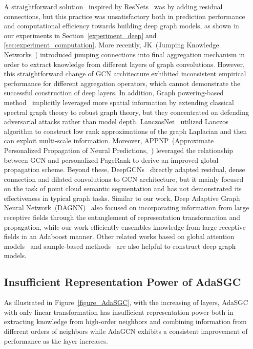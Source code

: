 \documentclass{article} \usepackage{iclr2021_conference,times}
\begin{document}
A straightforward solution~\citep{kipf2016semi,xu2018representation} inspired by ResNets~\citep{he2016deep} was by adding residual connections, but this practice was unsatisfactory both in prediction performance and computational efficiency towards building deep graph models, as shown in our experiments in Section~\ref{experiment_deep} and \ref{sec:experiment_computation}. More recently, JK~(Jumping Knowledge Networks~\citep{xu2018representation}) introduced jumping connections into final aggregation mechanism in order to extract knowledge from different layers of graph convolutions. However, this straightforward change of GCN architecture exhibited inconsistent empirical performance for different aggregation operators, which cannot demonstrate the successful construction of deep layers. In addition, Graph powering-based method~\citep{jin2019power} implicitly leveraged more spatial information by extending classical spectral graph theory to robust graph theory, but they concentrated on defending adversarial attacks rather than model depth. LanczosNet~\citep{liao2019lanczosnet} utilized Lanczos algorithm to construct low rank approximations of the graph Laplacian and then can exploit multi-scale information. Moreover, APPNP~(Approximate Personalized Propagation of Neural Predictions,~\citep{klicpera2018predict}) leveraged the relationship between GCN and personalized PageRank to derive an improved global propagation scheme. Beyond these, DeepGCNs~\citep{li2019can} directly adapted residual, dense connection and dilated convolutions to GCN architecture, but it mainly focused on the task of point cloud semantic segmentation and has not demonstrated its effectiveness in typical graph tasks. Similar to our work,  Deep Adaptive Graph Neural Network~(DAGNN)~\citep{liu2020towards} also focused on incorporating information from large receptive fields through the entanglement of representation transformation and propagation, while our work efficiently ensembles knowledge from large receptive fields in an Adaboost manner. Other related works based on global attention models~\citep{puny2020graph} and sample-based methods~\citep{zeng2019graphsaint}  are also helpful to construct deep graph models.

\subsection{Insufficient Representation Power of AdaSGC}
\label{sec:AdaSGC}
As illustrated in Figure~\ref{figure_AdaSGC}, with the increasing of layers, AdaSGC with only linear transformation has insufficient representation power both in extracting knowledge from high-order neighbors and combining information from different orders of neighbors while AdaGCN exhibits a consistent improvement of performance as the layer increases.
\end{document}
